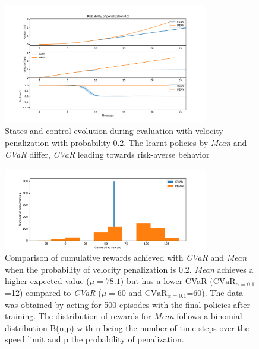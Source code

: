 \begin{figure}[ht]
        \centering
        \includegraphics[width=0.8\textwidth]{images/Car/CVAR/Trajectory_withstds_penal.pdf}
        \caption{States and control evolution during evaluation with velocity penalization
        with probability 0.2.
        The learnt policies by \textit{Mean} and \textit{CVaR} differ, \textit{CVaR} leading
        towards risk-averse behavior}
        \label{fig:traj_probpenal0.2}
    
\end{figure}


\begin{figure}[ht]
        \centering
        \includegraphics[width=0.8\textwidth]{images/Car/histogram_rewards1vs01.pdf}
        \caption{Comparison of cumulative rewards achieved with \textit{CVaR} and \textit{Mean}
        when the probability of velocity penalization is 0.2.
        \textit{Mean} achieves a higher expected value  ($\mu=78.1)$  but 
        has a lower CVaR ($\text{CVaR}_{\alpha= 0.1}$=12) compared to
        \textit{CVaR} ($\mu=60$ and $\text{CVaR}_{\alpha= 0.1}$=60).
        The data was obtained by acting for 500 episodes with the final policies after training.
        The distribution of rewards for \textit{Mean} follows a binomial distribution B(n,p)
        with n being the number of time steps over the speed limit and 
        p the probability of penalization.}
        \label{fig:histogram_cvar_vs_mean}
    
\end{figure}


